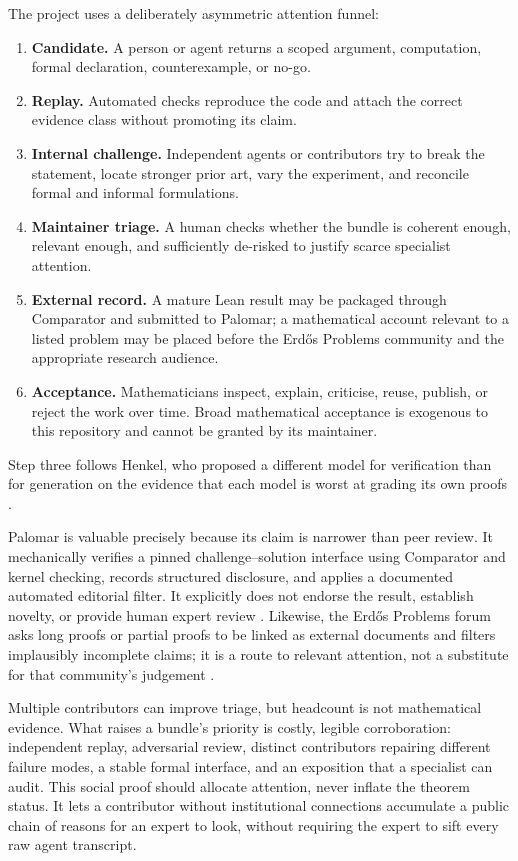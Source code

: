 \documentclass[10pt]{article}
\begin{document}
The project uses a deliberately asymmetric attention funnel:

\begin{enumerate}
\item \textbf{Candidate.}  A person or agent returns a scoped argument,
      computation, formal declaration, counterexample, or no-go.
\item \textbf{Replay.}  Automated checks reproduce the code and attach the
      correct evidence class without promoting its claim.
\item \textbf{Internal challenge.}  Independent agents or contributors try
      to break the statement, locate stronger prior art, vary the experiment,
      and reconcile formal and informal formulations.
\item \textbf{Maintainer triage.}  A human checks whether the bundle is
      coherent enough, relevant enough, and sufficiently de-risked to justify
      scarce specialist attention.
\item \textbf{External record.}  A mature Lean result may be packaged through
      Comparator and submitted to Palomar; a mathematical account relevant to
      a listed problem may be placed before the Erd\H{o}s Problems community
      and the appropriate research audience.
\item \textbf{Acceptance.}  Mathematicians inspect, explain, criticise, reuse,
      publish, or reject the work over time.  Broad mathematical acceptance is
      exogenous to this repository and cannot be granted by its maintainer.
\end{enumerate}

Step three follows Henkel, who proposed a different model for verification
than for generation on the evidence that each model is worst at grading its
own proofs \cite{henkel,openproofcorpus}.

Palomar is valuable precisely because its claim is narrower than peer review.
It mechanically verifies a pinned challenge--solution interface using
Comparator and kernel checking, records structured disclosure, and applies a
documented automated editorial filter.  It explicitly does not endorse the
result, establish novelty, or provide human expert review \cite{palomar}.
Likewise, the Erd\H{o}s Problems forum asks long proofs or partial proofs to be
linked as external documents and filters implausibly incomplete claims; it is
a route to relevant attention, not a substitute for that community's
judgement \cite{erdosproblems}.

Multiple contributors can improve triage, but headcount is not mathematical
evidence.  What raises a bundle's priority is costly, legible corroboration:
independent replay, adversarial review, distinct contributors repairing
different failure modes, a stable formal interface, and an exposition that a
specialist can audit.  This social proof should allocate attention, never
inflate the theorem status.  It lets a contributor without institutional
connections accumulate a public chain of reasons for an expert to look,
without requiring the expert to sift every raw agent transcript.
\end{document}
